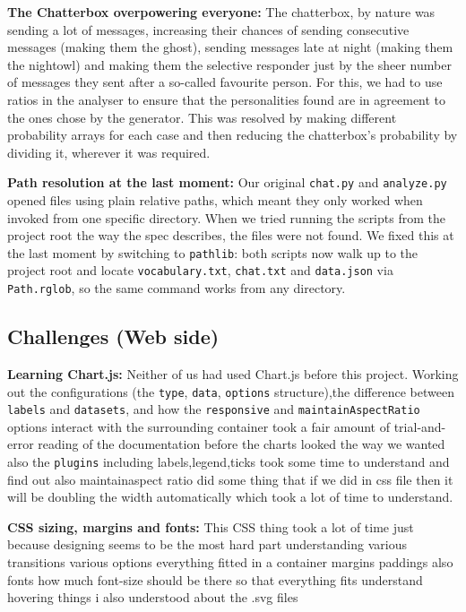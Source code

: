 \documentclass[12pt]{article}
\begin{document}
\textbf{The Chatterbox overpowering everyone:} The chatterbox, by nature was sending a lot of messages, increasing their chances of sending consecutive messages (making them the ghost), sending messages late at night (making them the nightowl) and making them the selective responder just by the sheer number of messages they sent after a so-called favourite person.
For this, we had to use ratios in the analyser to ensure that the personalities found are in agreement to the ones chose by the generator. This was resolved by making different probability arrays for each case and then reducing the chatterbox's probability by  dividing it, wherever it was required.

\textbf{Path resolution at the last moment:} Our original \texttt{chat.py} and
\texttt{analyze.py} opened files using plain relative paths, which meant they
only worked when invoked from one specific directory. When we tried running
the scripts from the project root the way the spec describes, the files were
not found. We fixed this at the last moment by switching to \texttt{pathlib}:
both scripts now walk up to the project root and locate
\texttt{vocabulary.txt}, \texttt{chat.txt} and \texttt{data.json} via
\texttt{Path.rglob}, so the same command works from any directory.

\subsection{Challenges (Web side)}

\textbf{Learning Chart.js:} Neither of us had used Chart.js before this
project. Working out the configurations (the \texttt{type},
\texttt{data}, \texttt{options} structure),the difference between
\texttt{labels} and \texttt{datasets}, and how the \texttt{responsive} and
\texttt{maintainAspectRatio} options interact with the surrounding container
took a fair amount of trial-and-error reading of the documentation before the
charts looked the way we wanted also the \texttt{plugins} including labels,legend,ticks took some time to understand and find out also maintainaspect ratio did some thing that if we did in css file then it will be doubling the width automatically which took a lot of time to understand.

\textbf{CSS sizing, margins and fonts: } This CSS thing took a lot of time just because designing seems to be the most hard part understanding various transitions various options everything fitted in a container margins paddings also fonts how much font-size should be there so that everything fits understand hovering things i also understood about the .svg files 
\end{document}
